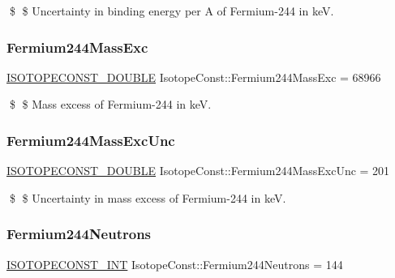 \$ \$ Uncertainty in binding energy per A of Fermium-\/244 in keV. \mbox{\label{group___isotope_const-_fermium-_fm244_ga7af22d201ba12acd79ca75c6b6a62283}} 
\subsubsection{\texorpdfstring{Fermium244\+Mass\+Exc}{Fermium244MassExc}}
{\footnotesize\ttfamily \mbox{\hyperlink{group___isotope_const-_macros_ga8f45a7272ce02c0b4c65c44636ed719a}{I\+S\+O\+T\+O\+P\+E\+C\+O\+N\+S\+T\+\_\+\+D\+O\+U\+B\+LE}} Isotope\+Const\+::\+Fermium244\+Mass\+Exc = 68966}

\$ \$ Mass excess of Fermium-\/244 in keV. \mbox{\label{group___isotope_const-_fermium-_fm244_gaefb52ac2682dc5e8f5f7bbfa4913358d}} 
\subsubsection{\texorpdfstring{Fermium244\+Mass\+Exc\+Unc}{Fermium244MassExcUnc}}
{\footnotesize\ttfamily \mbox{\hyperlink{group___isotope_const-_macros_ga8f45a7272ce02c0b4c65c44636ed719a}{I\+S\+O\+T\+O\+P\+E\+C\+O\+N\+S\+T\+\_\+\+D\+O\+U\+B\+LE}} Isotope\+Const\+::\+Fermium244\+Mass\+Exc\+Unc = 201}

\$ \$ Uncertainty in mass excess of Fermium-\/244 in keV. \mbox{\label{group___isotope_const-_fermium-_fm244_ga683536860c52f4eae0fccdfd3106ec1f}} 
\subsubsection{\texorpdfstring{Fermium244\+Neutrons}{Fermium244Neutrons}}
{\footnotesize\ttfamily \mbox{\hyperlink{group___isotope_const-_macros_ga5f18360b3e99483a35c32d789e62621c}{I\+S\+O\+T\+O\+P\+E\+C\+O\+N\+S\+T\+\_\+\+I\+NT}} Isotope\+Const\+::\+Fermium244\+Neutrons = 144}


